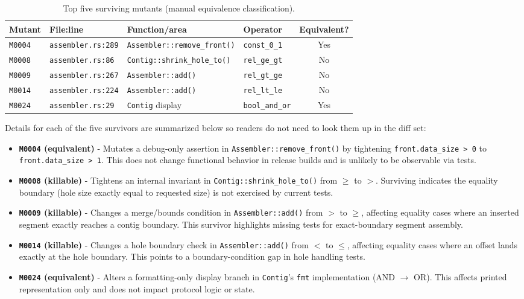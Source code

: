 \documentclass[11pt,a4paper]{article}
\begin{document}
\begin{table}[H]
\centering
\caption{Top five surviving mutants (manual equivalence classification).}
\label{tab:equivmutants}
\footnotesize
\begin{tabularx}{\textwidth}{l l X l c}
\toprule
\textbf{Mutant} & \textbf{File:line} & \textbf{Function/area} & \textbf{Operator} & \textbf{Equivalent?} \\
\midrule
\texttt{M0004} & \texttt{assembler.rs:289} & \texttt{Assembler::remove\_front()} & \texttt{const\_0\_1} & Yes \\
\texttt{M0008} & \texttt{assembler.rs:86}  & \texttt{Contig::shrink\_hole\_to()} & \texttt{rel\_ge\_gt} & No \\
\texttt{M0009} & \texttt{assembler.rs:267} & \texttt{Assembler::add()} & \texttt{rel\_gt\_ge} & No \\
\texttt{M0014} & \texttt{assembler.rs:224} & \texttt{Assembler::add()} & \texttt{rel\_lt\_le} & No \\
\texttt{M0024} & \texttt{assembler.rs:29}  & \texttt{Contig} display & \texttt{bool\_and\_or} & Yes \\
\bottomrule
\end{tabularx}
\end{table}

Details for each of the five survivors are summarized below so readers do not need to look them up in the diff set:

\begin{itemize}[noitemsep]
\item \textbf{\texttt{M0004} (equivalent)} - Mutates a debug-only assertion in \texttt{Assembler::remove\_front()} by tightening \texttt{front.data\_size > 0} to \texttt{front.data\_size > 1}. This does not change functional behavior in release builds and is unlikely to be observable via tests.
\item \textbf{\texttt{M0008} (killable)} - Tightens an internal invariant in \texttt{Contig::shrink\_hole\_to()} from \texttt{$\geq$} to \texttt{$>$}. Surviving indicates the equality boundary (hole size exactly equal to requested size) is not exercised by current tests.
\item \textbf{\texttt{M0009} (killable)} - Changes a merge/bounds condition in \texttt{Assembler::add()} from \texttt{$>$} to \texttt{$\geq$}, affecting equality cases where an inserted segment exactly reaches a contig boundary. This survivor highlights missing tests for exact-boundary segment assembly.
\item \textbf{\texttt{M0014} (killable)} - Changes a hole boundary check in \texttt{Assembler::add()} from \texttt{$<$} to \texttt{$\leq$}, affecting equality cases where an offset lands exactly at the hole boundary. This points to a boundary-condition gap in hole handling tests.
\item \textbf{\texttt{M0024} (equivalent)} - Alters a formatting-only display branch in \texttt{Contig}'s \texttt{fmt} implementation (AND $\rightarrow$ OR). This affects printed representation only and does not impact protocol logic or state.
\end{itemize}
\end{document}
